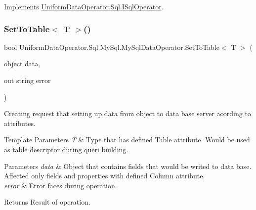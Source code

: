 Implements \mbox{\hyperlink{interface_uniform_data_operator_1_1_sql_1_1_i_sql_operator_ab2ab621174a956a67f9799469570dd11}{Uniform\+Data\+Operator.\+Sql.\+I\+Sql\+Operator}}.

\mbox{\label{class_uniform_data_operator_1_1_sql_1_1_my_sql_1_1_my_sql_data_operator_ac1bee965fd57e9b2949c09a6b72a9e3e}} 
\subsubsection{\texorpdfstring{Set\+To\+Table$<$ T $>$()}{SetToTable< T >()}}
{\footnotesize\ttfamily bool Uniform\+Data\+Operator.\+Sql.\+My\+Sql.\+My\+Sql\+Data\+Operator.\+Set\+To\+Table$<$ T $>$ (\begin{DoxyParamCaption}\item[{object}]{data,  }\item[{out string}]{error }\end{DoxyParamCaption})}



Creating request that setting up data from object to data base server acording to attributes. 


\begin{DoxyTemplParams}{Template Parameters}
{\em T} & Type that has defined Table attribute. Would be used as table descriptor during queri building.\\
\hline
\end{DoxyTemplParams}

\begin{DoxyParams}{Parameters}
{\em data} & Object that contain\textquotesingle{}s fields that would be writed to data base. Affected only fields and properties with defined Column attribute.\\
\hline
{\em error} & Error faces during operation.\\
\hline
\end{DoxyParams}
\begin{DoxyReturn}{Returns}
Result of operation.
\end{DoxyReturn}


